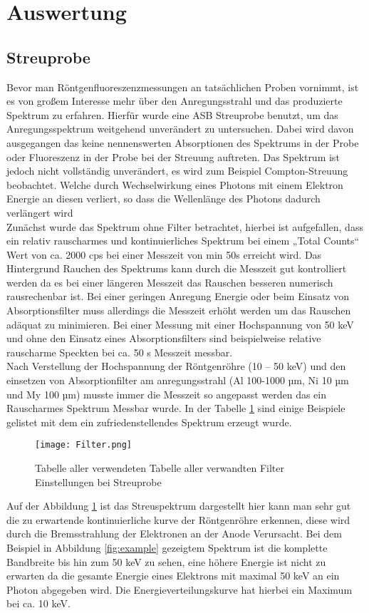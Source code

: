 \section{Auswertung}
\subsection{Streuprobe}
Bevor man Röntgenfluoreszenzmessungen an tatsächlichen Proben vornimmt, ist es von großem Interesse mehr über den Anregungsstrahl und das produzierte Spektrum zu erfahren. Hierfür wurde eine ASB Streuprobe benutzt, um das Anregungsspektrum weitgehend unverändert zu untersuchen. Dabei wird davon ausgegangen das keine nennenswerten Absorptionen des Spektrums in der Probe oder Fluoreszenz in der Probe bei der Streuung auftreten. Das Spektrum ist jedoch nicht vollständig unverändert, es wird zum Beispiel Compton-Streuung beobachtet. Welche durch Wechselwirkung eines Photons mit einem Elektron Energie an diesen verliert, so dass die Wellenlänge des Photons dadurch verlängert wird \\
Zunächst wurde das Spektrum ohne Filter betrachtet, hierbei ist aufgefallen, dass ein relativ rauscharmes und kontinuierliches Spektrum bei einem „Total Counts“ Wert von ca. 2000 cps bei einer Messzeit von min 50s erreicht wird. Das Hintergrund Rauchen des Spektrums kann durch die Messzeit gut kontrolliert werden da es bei einer längeren Messzeit das Rauschen besseren numerisch rausrechenbar ist. Bei einer geringen Anregung Energie oder beim Einsatz von Absorptionsfilter muss allerdings die Messzeit erhöht werden um das Rauschen adäquat zu minimieren. Bei einer Messung mit einer Hochspannung von 50 keV und ohne den Einsatz eines Absorptionsfilters sind beispielweise relative rauscharme Speckten bei ca. 50 s Messzeit messbar. \\
Nach Verstellung der Hochspannung der Röntgenröhre (10 – 50 keV) und den einsetzen von Absorptionfilter am anregungsstrahl (Al 100-1000 µm, Ni 10 µm und My 100 µm) musste immer die Messzeit so angepasst werden das ein Rauscharmes Spektrum Messbar wurde. In der Tabelle \ref{fig:Filter} sind einige Beispiele gelistet mit dem ein zufriedenstellendes Spektrum erzeugt wurde.\\
\begin{figure}[h]
 \centering
 \texttt{[image: Filter.png]}
 \caption[Filter Tabelle]{Tabelle aller verwendeten Tabelle aller verwandten Filter Einstellungen bei Streuprobe}
 \label{fig:Filter}
\end{figure}
Auf der Abbildung \ref{fig:Filter} ist das Streuspektrum dargestellt hier kann man sehr gut die zu erwartende kontinuierliche kurve der Röntgenröhre erkennen, diese wird durch die Bremsstrahlung der Elektronen an der Anode Verursacht. Bei dem Beispiel in Abbildung \ref{fig:example} gezeigtem Spektrum ist die komplette Bandbreite bis hin zum 50 keV zu sehen, eine höhere Energie ist nicht zu erwarten da die gesamte Energie eines Elektrons mit maximal 50 keV an ein Photon abgegeben wird. Die Energieverteilungskurve hat hierbei ein Maximum bei ca. 10 keV.
